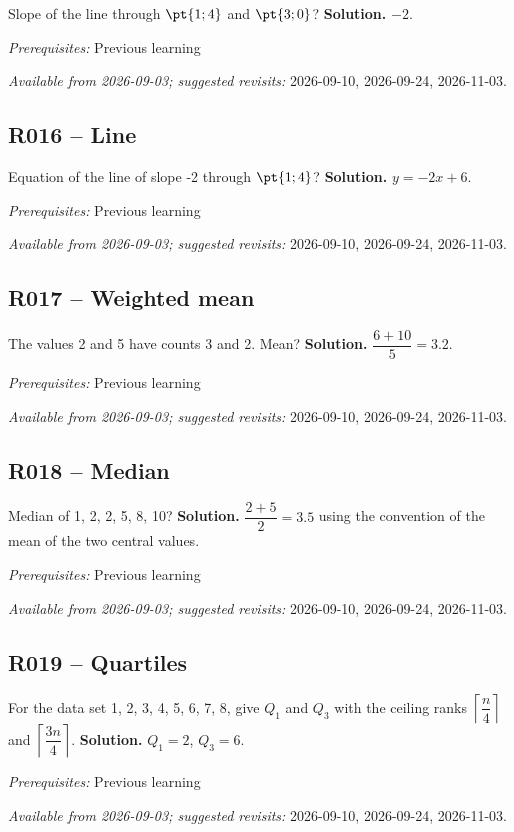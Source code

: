 Slope of the line through $\pt{1;4}$ and $\pt{3;0}$?
\ifmxteacher\textbf{Solution.} $-2$.\par\textit{Prerequisites:} Previous learning\par\textit{Available from 2026-09-03; suggested revisits:} 2026-09-10, 2026-09-24, 2026-11-03.\fi
{}\subsection*{R016 -- Line}\label{R016}
Equation of the line of slope -2 through $\pt{1;4}$?
\ifmxteacher\textbf{Solution.} $y=-2x+6$.\par\textit{Prerequisites:} Previous learning\par\textit{Available from 2026-09-03; suggested revisits:} 2026-09-10, 2026-09-24, 2026-11-03.\fi
{}\subsection*{R017 -- Weighted mean}\label{R017}
The values 2 and 5 have counts 3 and 2. Mean?
\ifmxteacher\textbf{Solution.} $\dfrac{6+10}{5}=\num{3,2}$.\par\textit{Prerequisites:} Previous learning\par\textit{Available from 2026-09-03; suggested revisits:} 2026-09-10, 2026-09-24, 2026-11-03.\fi
{}\subsection*{R018 -- Median}\label{R018}
Median of 1, 2, 2, 5, 8, 10?
\ifmxteacher\textbf{Solution.} $\dfrac{2+5}{2}=\num{3,5}$ using the convention of the mean of the two central values.\par\textit{Prerequisites:} Previous learning\par\textit{Available from 2026-09-03; suggested revisits:} 2026-09-10, 2026-09-24, 2026-11-03.\fi
{}\subsection*{R019 -- Quartiles}\label{R019}
For the data set 1, 2, 3, 4, 5, 6, 7, 8, give $Q_1$ and $Q_3$ with the ceiling ranks $\left\lceil\dfrac n4\right\rceil$ and $\left\lceil\dfrac{3n}4\right\rceil$.
\ifmxteacher\textbf{Solution.} $Q_1=2$, $Q_3=6$.\par\textit{Prerequisites:} Previous learning\par\textit{Available from 2026-09-03; suggested revisits:} 2026-09-10, 2026-09-24, 2026-11-03.\fi
